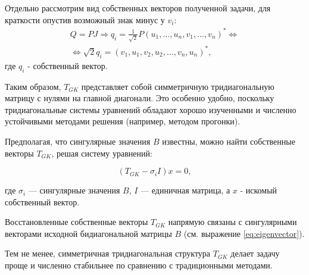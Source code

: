 Отдельно рассмотрим вид собственных векторов полученной задачи, для краткости опустив возможный знак минус у \(v_i\):
\begin{equation} \label{eq:eigenvector}
    \begin{split}
        Q=PJ \Rightarrow q_{i}=\frac{1}{\sqrt{2}}P(u_1,\dots,u_n,v_1,\dots,v_n)^* \Leftrightarrow \\[6pt]  \Leftrightarrow \sqrt{2}q_i=(v_1,u_1,v_2,u_2,\dots,v_n,u_n)^*, 
    \end{split}
\end{equation}
где \(q_i\) - собственный вектор.

Таким образом, \( T_{GK} \) представляет собой симметричную тридиагональную матрицу с нулями на главной диагонали. Это особенно удобно, поскольку тридиагональные системы уравнений обладают хорошо изученными и численно устойчивыми методами решения (например, методом прогонки).




Предполагая, что сингулярные значения \( B \) известны, можно найти собственные векторы \( T_{GK} \), решая систему уравнений:

\begin{equation}
( T_{GK} - \sigma_i I )x = 0,
\end{equation}

где \( \sigma_i \) — сингулярные значения \( B \), \( I \) — единичная матрица, а \(x\) - искомый собственный вектор.

Восстановленные собственные векторы \( T_{GK} \) напрямую связаны с сингулярными векторами исходной бидиагональной матрицы \( B \) (см. выражение \eqref{eq:eigenvector}).

Тем не менее, симметричная тридиагональная структура \( T_{GK} \) делает задачу проще и численно стабильнее по сравнению с традиционными методами.



